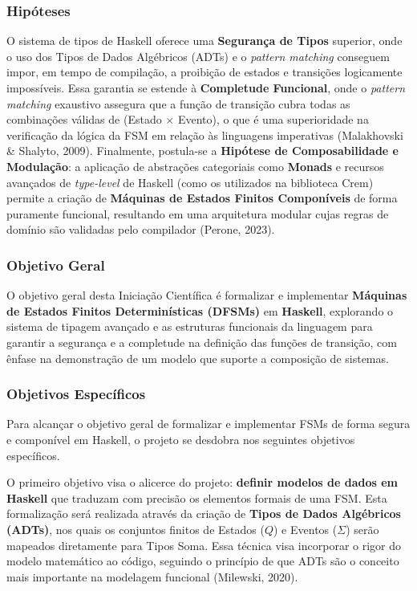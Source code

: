 \documentclass[12pt,a4paper]{article}
\begin{document}
\subsubsection{Hipóteses}
O sistema de tipos de Haskell oferece uma \textbf{Segurança de Tipos} superior, onde o uso dos Tipos de Dados Algébricos (ADTs) e o \textit{pattern matching} conseguem impor, em tempo de compilação, a proibição de estados e transições logicamente impossíveis. Essa garantia se estende à \textbf{Completude Funcional}, onde o \textit{pattern matching} exaustivo assegura que a função de transição cubra todas as combinações válidas de (Estado $\times$ Evento), o que é uma superioridade na verificação da lógica da FSM em relação às linguagens imperativas (Malakhovski \& Shalyto, 2009). Finalmente, postula-se a \textbf{Hipótese de Composabilidade e Modulação}: a aplicação de abstrações categoriais como \textbf{Monads} e recursos avançados de \textit{type-level} de Haskell (como os utilizados na biblioteca Crem) permite a criação de \textbf{Máquinas de Estados Finitos Componíveis} de forma puramente funcional, resultando em uma arquitetura modular cujas regras de domínio são validadas pelo compilador (Perone, 2023).

\subsubsection{Objetivo Geral}
O objetivo geral desta Iniciação Científica é formalizar e implementar \textbf{Máquinas de Estados Finitos Determinísticas (DFSMs)} em \textbf{Haskell}, explorando o sistema de tipagem avançado e as estruturas funcionais da linguagem para garantir a segurança e a completude na definição das funções de transição, com ênfase na demonstração de um modelo que suporte a composição de sistemas.

\subsubsection{Objetivos Específicos}

Para alcançar o objetivo geral de formalizar e implementar FSMs de forma segura e componível em Haskell, o projeto se desdobra nos seguintes objetivos específicos.

O primeiro objetivo visa o alicerce do projeto: \textbf{definir modelos de dados em Haskell} que traduzam com precisão os elementos formais de uma FSM. Esta formalização será realizada através da criação de \textbf{Tipos de Dados Algébricos (ADTs)}, nos quais os conjuntos finitos de Estados ($Q$) e Eventos ($\Sigma$) serão mapeados diretamente para Tipos Soma. Essa técnica visa incorporar o rigor do modelo matemático ao código, seguindo o princípio de que ADTs são o conceito mais importante na modelagem funcional (Milewski, 2020).
\end{document}
